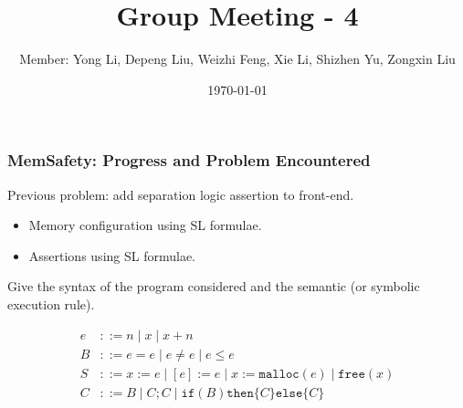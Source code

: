 \documentclass[aspectratio=1610, 13pt]{beamer}
\title{Group Meeting - 4}
\date{\today}
\author{Member: Yong Li, Depeng Liu, Weizhi Feng, Xie Li, Shizhen Yu, Zongxin Liu}
\begin{document}
\maketitle

\begin{frame}\frametitle{MemSafety: Progress and Problem Encountered}

Previous problem: add separation logic assertion to front-end.

\begin{itemize}
\item Memory configuration using SL formulae.
\item Assertions using SL formulae.
\end{itemize}

Give the syntax of the program considered and the semantic (or symbolic execution rule).

\begin{align*}
e &::= n \mid x \mid x + n\\
B &::= e = e \mid e\ne e\mid e \le e\\
S &::= x:= e\mid [e] := e\mid x := \mathtt{malloc}(e)\mid \mathtt{free}(x)\\
C &::= B\mid C;C\mid \mathtt{if }(B)\mathtt{ then }\{C\}\mathtt{ else }\{C\}
\end{align*}

\end{frame}
\end{document}

